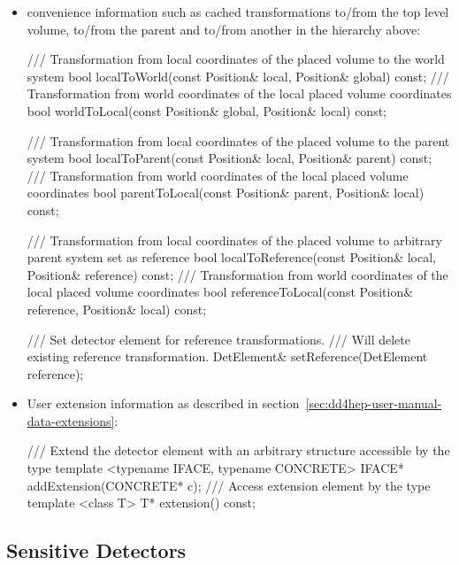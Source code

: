 \documentclass[10pt,a4paper]{article}
\begin{document}
\begin{itemize}
\item convenience information such as cached transformations
    to/from the top level volume, to/from the parent 
    and to/from another  in the hierarchy above:
\begin{code}
  /// Transformation from local coordinates of the placed volume to the world system
  bool localToWorld(const Position& local, Position& global) const;
  /// Transformation from world coordinates of the local placed volume coordinates
  bool worldToLocal(const Position& global, Position& local) const;

  /// Transformation from local coordinates of the placed volume to the parent system
  bool localToParent(const Position& local, Position& parent) const;
  /// Transformation from world coordinates of the local placed volume coordinates
  bool parentToLocal(const Position& parent, Position& local) const;

  /// Transformation from local coordinates of the placed volume to arbitrary parent system set as reference
  bool localToReference(const Position& local, Position& reference) const;
  /// Transformation from world coordinates of the local placed volume coordinates
  bool referenceToLocal(const Position& reference, Position& local) const;

  /// Set detector element for reference transformations. 
  /// Will delete existing reference transformation.
  DetElement& setReference(DetElement reference);
\end{code}

\item User extension information as described in section~\ref{sec:dd4hep-user-manual-data-extensions}:
\begin{code}
  /// Extend the detector element with an arbitrary structure accessible by the type
  template <typename IFACE, typename CONCRETE> IFACE* addExtension(CONCRETE* c);
  /// Access extension element by the type
  template <class T> T* extension() const;
\end{code}

\end{itemize}


\newpage
\subsection{Sensitive Detectors}
\label{sec:dd4hep-user-manual-sensitive-detectors}
\end{document}
